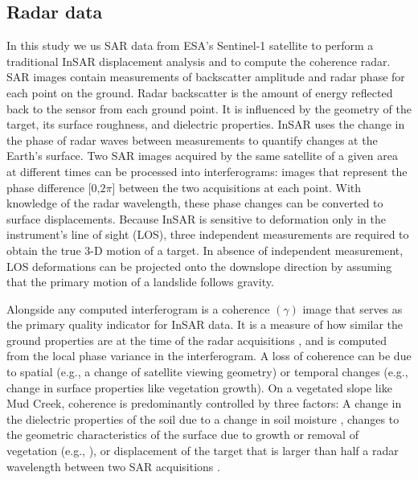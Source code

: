 \documentclass[journal abbreviation, manuscript]{copernicus}
\begin{document}
\subsection{Radar data}
In this study we us SAR data from ESA's Sentinel-1 satellite to perform a traditional InSAR displacement analysis and to compute the coherence radar. SAR images contain measurements of backscatter amplitude and radar phase for each point on the ground. Radar backscatter is the amount of energy reflected back to the sensor from each ground point. It is influenced by the geometry of the target, its surface roughness, and dielectric properties. InSAR uses the change in the phase of radar waves between measurements to quantify changes at the Earth's surface. Two SAR images acquired by the same satellite of a given area at different times can be processed into interferograms: images that represent the phase difference [0,$2\pi$] between the two acquisitions at each point. With knowledge of the radar wavelength, these phase changes can be converted to surface displacements. Because InSAR is sensitive to deformation only in the instrument's line of sight (LOS), three independent measurements are  required to obtain the true 3-D motion of a target. In absence of independent measurement, LOS deformations can be projected onto the downslope direction by assuming that the primary motion of a landslide follows gravity.     
\par  
 Alongside any computed interferogram is a coherence $(\gamma)$ image that serves as the primary quality indicator for InSAR data. It is a measure of how similar the ground properties are at the time of the radar acquisitions \citep{Scott2017}, and is computed from the local phase variance in the interferogram. A loss of coherence can be due to  spatial (e.g., a change of satellite viewing geometry) or temporal changes (e.g., change in surface properties like vegetation growth). On a vegetated slope like Mud Creek, coherence is predominantly controlled by three factors: A change in the dielectric properties of the soil due to a change in soil moisture \citep{molan2020}, changes to the geometric characteristics of the surface due to growth or removal of vegetation (e.g., \cite{Ruescas2010}), or displacement of the target that is larger than half a radar wavelength between two SAR acquisitions \citep{Zhou2009}. \par
\end{document}
